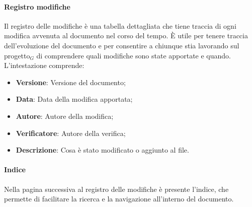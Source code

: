 \documentclass[10pt]{article}
\begin{document}
\begin{justify}
        \paragraph{Registro modifiche}
        Il registro delle modifiche è una tabella dettagliata che tiene traccia di ogni modifica avvenuta al documento nel corso del tempo. È utile per tenere traccia dell'evoluzione del documento e per consentire a chiunque stia lavorando sul progetto$_G$ di comprendere quali modifiche sono state apportate e quando.
        L'intestazione comprende:
        \begin{itemize}
            \item \textbf{Versione}: Versione del documento;
            \item \textbf{Data}: Data della modifica apportata;
            \item \textbf{Autore}: Autore della modifica;
            \item \textbf{Verificatore}: Autore della verifica;
            \item \textbf{Descrizione}: Cosa è stato modificato o aggiunto al file.
        \end{itemize}

        \paragraph{Indice}
        Nella pagina successiva al registro delle modifiche è presente l'indice, che permette di facilitare la ricerca e la navigazione all'interno del documento.\\


\end{justify}
\end{document}
